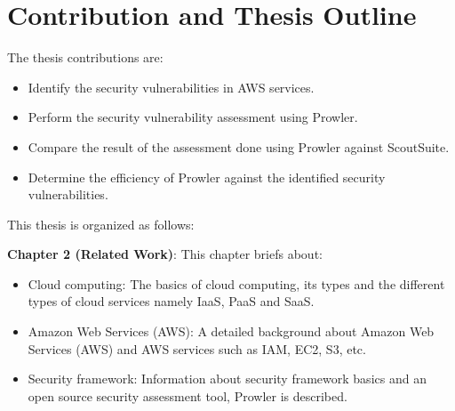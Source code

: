 \section{Contribution and Thesis Outline}
\par The thesis contributions are:
\begin{itemize}
    \item Identify the security vulnerabilities in AWS services.
\end{itemize}
\begin{itemize}
    \item Perform the security vulnerability assessment using Prowler.
\end{itemize}
\begin{itemize}
    \item Compare the result of the assessment done using Prowler against ScoutSuite.
\end{itemize}
\begin{itemize}
    \item Determine the efficiency of Prowler against the identified security vulnerabilities.
\end{itemize}

\par This thesis is organized as follows:
\par \textbf{Chapter 2 (Related Work)}: This chapter briefs about:
\begin{itemize}
    \item Cloud computing: The basics of cloud computing, its types and the different types of cloud services namely IaaS, PaaS and SaaS.
\end{itemize}
\begin{itemize}
    \item Amazon Web Services (AWS): A detailed background about Amazon Web Services (AWS) and AWS services such as IAM, EC2, S3, etc.
\end{itemize}
\begin{itemize}
    \item Security framework: Information about security framework basics and an open source security assessment tool, Prowler is described.
\end{itemize}

